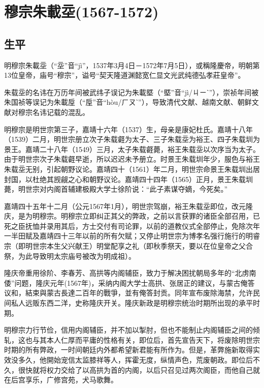 
\section{穆宗朱載坖\tiny(1567-1572)}

\subsection{生平}

明穆宗朱載坖（“坖”音“jì”，1537年3月4日－1572年7月5日），或稱隆慶帝，明朝第13位皇帝，庙号“穆宗”，谥号“契天隆道渊懿宽仁显文光武纯德弘孝莊皇帝”。

朱载坖的名讳在万历年间被武纬子误记为朱載塈（“塈”音“jì/ㄐㄧˋ”），崇祯年间被朱国祯等误记为朱載垕（“垕”音“hòu/ㄏㄡˋ”），导致清代文献、越南文献、朝鲜文献对穆宗名讳记载的混乱。

明穆宗是明世宗第三子，嘉靖十六年（1537）生，母亲是康妃杜氏。嘉靖十八年（1539）二月，明世宗册立次子朱载壡为太子、三子朱载坖为裕王、四子朱载圳为景王。嘉靖二十八年（1549）三月，太子朱载壡薨，裕王朱载坖以次序当为太子。由于明世宗次子朱载壡早逝，所以迟迟未予册立。时景王朱载圳年少，服色与裕王朱载坖无别，引起朝野议论。嘉靖四十（1561）年二月，明世宗命景王朱载圳出居封国，以杜绝其觊觎之心和朝野议论。嘉靖四十四年（1565）正月，景王朱载圳薨，明世宗对内阁首辅建极殿大学士徐阶说：“此子素谋夺嫡，今死矣。”

嘉靖四十五年十二月（公元1567年1月），明世宗驾崩，裕王朱载坖即位，改元隆庆，是为明穆宗。明穆宗立即纠正其父的弊政，之前以言获罪的诸臣全部召用，已死之臣抚恤并录用其后，方士交付有司论罪，以前的道教仪式全部停止，免除次年一半田赋及嘉靖四十三年以前的所有欠赋；又停止明世宗为博孝名强行施行的明睿宗（即明世宗本生父兴献王）明堂配享之礼（即秋季祭天，要以在位皇帝之父合祭，为此导致明太宗庙号被改为明成祖）。

隆庆帝重用徐阶、李春芳、高拱等内阁辅臣，致力于解决困扰朝局多年的“北虏南倭”问题，隆庆元年(1567年)，采纳内阁大学士高拱、张居正的建议，与蒙古俺答议和，結束與蒙古長達二百年的戰爭，並有俺答封贡。同年宣布废除海禁，允许民间私人远贩东西二洋，史称隆庆开关。隆庆新政是明穆宗统治时期所出现的承平时期。

明穆宗力行节俭，信用内阁辅臣，并不加以掣肘，但也不能制止内阁辅臣之间的倾轧，这也与其本人仁厚而平庸的性格有关，即位后，首先宣告天下，将废除明世宗时期的所有弊政，一时间朝廷内外都希望新君能有所作为。但是，革弊施新取得实效没多久，他開始宠信太监膝祥等人，挥霍无度，纵情声色，荒废朝政。即位后不久，很快就将权力交给了以高拱为首的内阁，以后只召见过两次阁臣，而他自己就在后宫享乐，广修宫苑，犬马歌舞。

